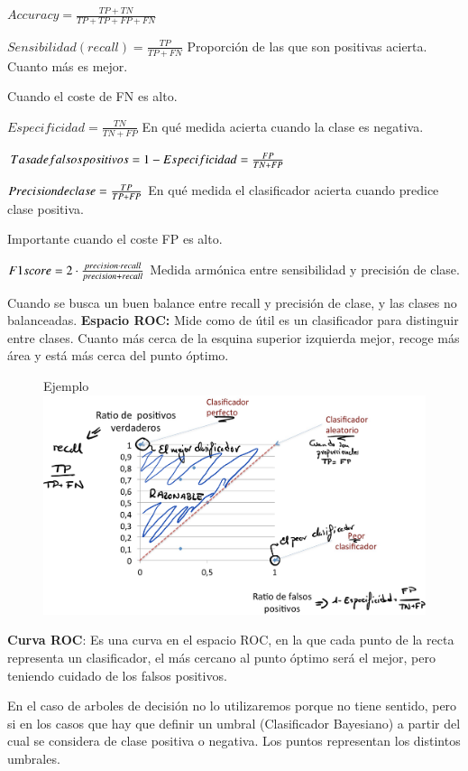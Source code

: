 \documentclass[12pt]{report} %
\begin{document}
\(Accuracy= \frac {TP+TN}{TP+TP+FP+FN}\)

\(Sensibilidad(recall)= \frac {TP}{TP+FN}\) Proporción de las que son
positivas acierta. Cuanto más es mejor.

Cuando el coste de FN es alto.

\(Especificidad= \frac {TN}{TN+FP}\) En qué medida acierta cuando la
clase es negativa.

\(Tasa \space de\space falsos \space positivos=1-Especificidad= \frac {FP}{TN+FP}\)

\(Precision \space de \space clase= \frac {TP}{TP+FP}\) En qué medida el
clasificador acierta cuando predice clase positiva.

Importante cuando el coste FP es alto.

\(F1 \space score= 2\cdot \frac {precision \cdot recall}{precision +recall}\)
Medida armónica entre sensibilidad y precisión de clase.

Cuando se busca un buen balance entre recall y precisión de clase, y las
clases no balanceadas.
\newpage
\textbf{Espacio ROC:} Mide como de útil es un clasificador para
distinguir entre clases. Cuanto más cerca de la esquina superior
izquierda mejor, recoge más área y está más cerca del punto óptimo.
\begin{figure}[H]
	Ejemplo
	{\includegraphics[scale=.2]{Untitled 12.png}}
\end{figure}
\textbf{Curva ROC}: Es una curva en el espacio ROC, en la que cada punto
de la recta representa un clasificador, el más cercano al punto óptimo
será el mejor, pero teniendo cuidado de los falsos positivos.

En el caso de arboles de decisión no lo utilizaremos porque no tiene 
sentido, pero si en los casos que hay que definir un umbral 
(Clasificador Bayesiano) a partir del cual se considera de clase positiva 
o negativa. Los puntos representan los distintos umbrales.
\end{document}
